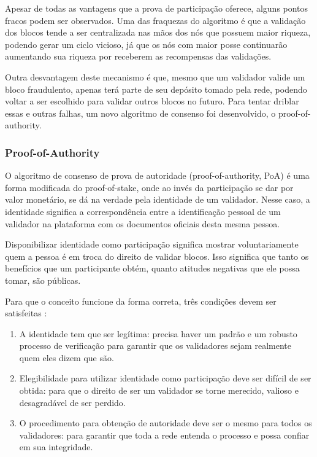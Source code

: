 \documentclass[openright]{normas-utf-tex} %
\begin{document}
Apesar de todas as vantagens que a prova de participação oferece, alguns pontos fracos podem ser observados. Uma das fraquezas do algoritmo é que a validação dos blocos tende a ser centralizada nas mãos dos nós que possuem maior riqueza, podendo gerar um ciclo vicioso, já que os nós com maior posse continuarão aumentando sua riqueza por receberem as recompensas das validações.

Outra desvantagem deste mecanismo é que, mesmo que um validador valide um bloco fraudulento, apenas terá parte de seu depósito tomado pela rede, podendo voltar a ser escolhido para validar outros blocos no futuro. Para tentar driblar essas e outras falhas, um novo algoritmo de consenso foi desenvolvido, o proof-of-authority.

\subsubsection{Proof-of-Authority}

O algoritmo de consenso de prova de autoridade (proof-of-authority, PoA) é uma forma modificada do proof-of-stake, onde ao invés da participação se dar por valor monetário, se dá na verdade pela identidade de um validador. Nesse caso, a identidade significa a correspondência entre a identificação pessoal de um validador na plataforma com os documentos oficiais desta mesma pessoa.

Disponibilizar identidade como participação significa mostrar voluntariamente quem a pessoa é em troca do direito de validar blocos. Isso significa que tanto os benefícios que um participante obtém, quanto  atitudes negativas que ele possa tomar, são públicas.

Para que o conceito funcione da forma correta, três condições devem ser satisfeitas \cite{POANetwork}:
\begin{enumerate}
\item A identidade tem que ser legítima: precisa haver um padrão e um robusto processo de verificação para garantir que os validadores sejam realmente quem eles dizem que são.
\item Elegibilidade para utilizar identidade como participação deve ser difícil de ser obtida: para que o direito de ser um validador se torne merecido, valioso e desagradável de ser perdido.
\item O procedimento para obtenção de autoridade deve ser o mesmo para todos os validadores: para garantir que toda a rede entenda o processo e possa confiar em sua integridade.
\end{enumerate}
\end{document}
